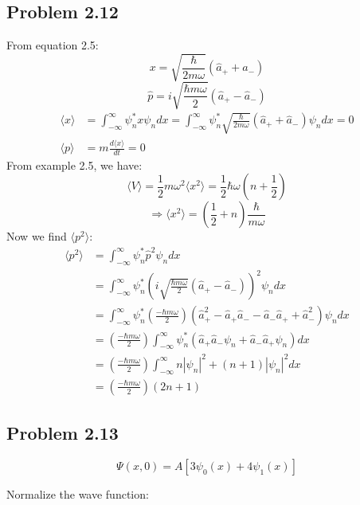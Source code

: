 \documentclass{article}
\begin{document}
\subsection*{Problem 2.12}
From equation 2.5:
\[x = \sqrt{\frac{\hbar}{2 m \omega}} (\hat{a}_+ + \hat{a}_-)\]
\[\hat{p}= i \sqrt{\frac{\hbar m \omega}{2}}(\hat{a}_+ - \hat{a}_-)\]
\begin{align*}
	\langle x \rangle & = \int_{-\infty}^{\infty} \psi_n^* x \psi_n dx = \int_{-\infty}^{\infty} \psi_n^* \sqrt{\frac{\hbar}{2 m \omega}} (\hat{a}_+ + \hat{a}_-) \psi_n dx = 0 \\
	\langle p \rangle & = m\frac{d \langle x \rangle}{dt} = 0
\end{align*}
From example 2.5, we have:
\[\langle V \rangle = \frac{1}{2}m\omega^2 \langle x^2 \rangle = \frac{1}{2} \hbar \omega \left(n + \frac{1}{2}\right)\]
\[\Rightarrow \langle x^2 \rangle = (\frac{1}{2} + n) \frac{\hbar}{m \omega} \]
Now we find \(\langle p^2 \rangle\):
\begin{align*}
	\langle p^2 \rangle & = \int_{-\infty}^{\infty} \psi_n^* \hat{p}^2 \psi_n dx                                                                                                                \\
	                    & = \int_{-\infty}^{\infty} \psi_n^* \left(i \sqrt{\frac{\hbar m \omega}{2}}(\hat{a}_+ - \hat{a}_-)\right)^2 \psi_n dx                                                  \\
	                    & = \int_{-\infty}^{\infty} \psi_n^* \left(\frac{-\hbar m \omega}{2}\right) \left(\hat{a}^2_+ - \hat{a}_+ \hat{a}_- -\hat{a}_- \hat{a}_+ + \hat{a}^2_-\right) \psi_n dx \\
	                    & = \left(\frac{-\hbar m \omega}{2}\right) \int_{-\infty}^{\infty} \psi_n^* \left(\hat{a}_+ \hat{a}_- \psi_n + \hat{a}_- \hat{a}_+ \psi_n \right) dx                    \\
	                    & =  \left(\frac{-\hbar m \omega}{2}\right) \int_{-\infty}^{\infty} n|\psi_n|^2 + (n+1)|\psi_n|^2 dx                                                                    \\
	                    & = \left(\frac{-\hbar m \omega}{2}\right) (2n+1)
\end{align*}
\subsection*{Problem 2.13}
\[\Psi(x,0) = A[3\psi_0(x) + 4\psi_1(x)]\]

Normalize the wave function:
\end{document}
